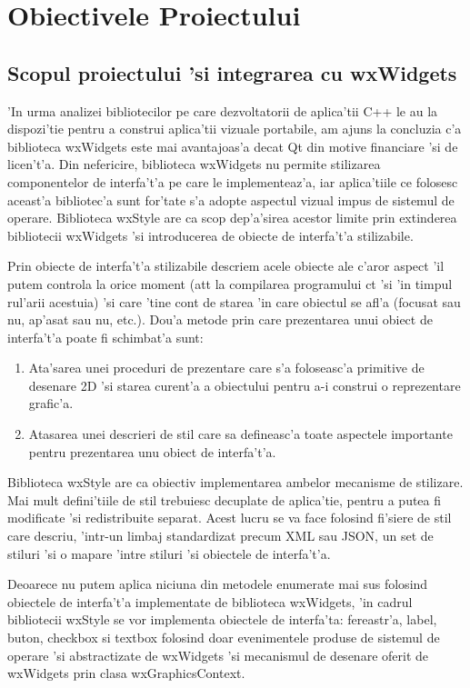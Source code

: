 \chapter{Obiectivele Proiectului}
\pagestyle{headings}

\section{Scopul proiectului 'si integrarea cu wxWidgets}

'In urma analizei bibliotecilor pe care dezvoltatorii de aplica'tii C++ le au la dispozi'tie pentru a construi aplica'tii vizuale portabile, am ajuns la concluzia c'a biblioteca wxWidgets este mai avantajoas'a decat Qt din motive financiare 'si de licen't'a. Din nefericire, biblioteca wxWidgets nu permite stilizarea componentelor de interfa't'a pe care le implementeaz'a, iar aplica'tiile ce folosesc aceast'a bibliotec'a sunt for'tate s'a adopte aspectul vizual impus de sistemul de operare. Biblioteca wxStyle are ca scop dep'a'sirea acestor limite prin extinderea bibliotecii wxWidgets 'si introducerea de obiecte de interfa't'a stilizabile.

Prin obiecte de interfa't'a stilizabile descriem acele obiecte ale c'aror aspect 'il putem controla la orice moment (at{\ia}t la compilarea programului c{\ia}t 'si 'in timpul rul'arii acestuia) 'si care 'tine cont de starea 'in care obiectul se afl'a (focusat sau nu, ap'asat sau nu, etc.). Dou'a metode prin care prezentarea unui obiect de interfa't'a poate fi schimbat'a sunt:

\begin{enumerate}
\item Ata'sarea unei proceduri de prezentare care s'a foloseasc'a primitive de desenare 2D 'si starea curent'a a obiectului pentru a-i construi o reprezentare grafic'a.
\item Atasarea unei descrieri de stil care sa defineasc'a toate aspectele importante pentru prezentarea unu obiect de interfa't'a.
\end{enumerate}

Biblioteca wxStyle are ca obiectiv implementarea ambelor mecanisme de stilizare. Mai mult defini'tiile de stil trebuiesc decuplate de aplica'tie, pentru a putea fi modificate 'si redistribuite separat. Acest lucru se va face folosind fi'siere de stil care descriu, 'intr-un limbaj standardizat precum XML sau JSON, un set de stiluri 'si o mapare 'intre stiluri 'si obiectele de interfa't'a.

Deoarece nu putem aplica niciuna din metodele enumerate mai sus folosind obiectele de interfa't'a implementate de biblioteca wxWidgets, 'in cadrul bibliotecii wxStyle se vor implementa obiectele de interfa'ta: fereastr'a, label, buton, checkbox si textbox folosind doar evenimentele produse de sistemul de operare 'si abstractizate de wxWidgets 'si mecanismul de desenare oferit de wxWidgets prin clasa wxGraphicsContext.

